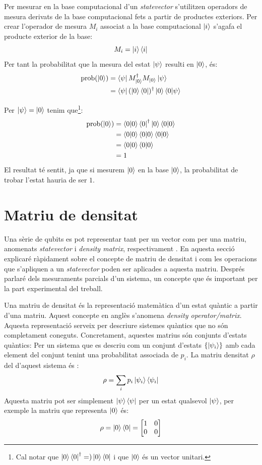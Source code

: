 Per mesurar en la base computacional d'un \textit{statevector} s'utilitzen operadors de mesura derivats de la base computacional fets a partir de productes exteriors. Per crear l'operador de mesura ${M_i}$ associat a la base computacional $\ket{i}$ s'agafa el producte exterior de la base:
$$
M_i = \ket{i}\bra{i}
$$
Per tant la probabilitat que la mesura del estat $\ket{\psi}$ resulti en $\ket{0}$, és:
\begin{align*}
	\mathrm{prob}(\ket{0}) &= \bra{\psi}M_{\ket{0}}^{\dagger}M_{\ket{0}} \ket{\psi}\\
	&= \bra{\psi}(\ket{0}\bra{0})^\dagger \ket{0}\bra{0}\ket{\psi} 
\end{align*}


Per $\ket{\psi} = \ket{0}$ tenim que\footnote{Cal notar que $\ket{0}\bra{0}^\dagger =) \ket{0}\bra{0}$ i que $\ket{0}$ és un vector unitari.}:
\begin{align*}
	\mathrm{prob}(\ket{0}) &= \bra{0}\ket{0}\bra{0}^\dagger \ket{0}\bra{0}\ket{0} \\
	&= \bra{0}\ket{0}\bra{0} \ket{0}\bra{0}\ket{0} \\
	&= \bra{0}\ket{0}\bra{0}\ket{0} \\
	&= 1
\end{align*}
El resultat té sentit, ja que si mesurem $\ket{0}$ en la base $\ket{0}$, la probabilitat de trobar l'estat hauria de ser $1$.

\section{Matriu de densitat}
Una sèrie de qubits es pot representar tant per un vector com per una matriu, anomenats \textit{statevector} i \textit{density matrix}, respectivament \cite{QCandQI}.
En aquesta secció explicaré ràpidament sobre el concepte de matriu de densitat i com les operacions que s'apliquen a un \textit{statevector} poden ser aplicades a aquesta matriu. Després parlaré dels mesuraments parcials d'un sistema, un concepte que és important per la part experimental del treball.

Una matriu de densitat és la representació matemàtica d'un estat quàntic a partir d'una matriu. Aquest concepte en anglès s'anomena \textit{density operator/matrix}. Aquesta representació serveix per descriure sistemes quàntics que no són completament coneguts. Concretament, aquestes matrius són conjunts d'estats quàntics: Per un sistema que es descriu com un conjunt d'estats $\{\ket{\psi_i}\}$ amb cada element del conjunt tenint una probabilitat associada de $p_i$. La matriu densitat $\rho$ del d'aquest sistema és \cite{QCandQI:density_matrix}:
$$
\rho = \sum_i p_i\ket{\psi_i}\bra{\psi_i}
$$
Aquesta matriu pot ser simplement $\ket{\psi}\bra{\psi}$ per un estat qualsevol $\ket{\psi}$, per exemple la matriu que representa $\ket{0}$ és:
$$
\rho = \ket{0}\bra{0} = \begin{bmatrix}
	1 & 0 \\
	0 & 0 
\end{bmatrix}
$$

